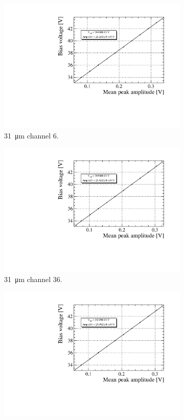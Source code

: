 \begin{figure}[htbp]
\begin{subfigure}{0.48\textwidth}
    \includegraphics[width=1\linewidth]{gfx/plots/WA/31/Breakdown_voltage6.pdf}
    \caption{\SI{31}{\micro m} channel $6$.}  
  \end{subfigure}
  \hfill  
  \begin{subfigure}{0.48\textwidth}
    \includegraphics[width=1\linewidth]{gfx/plots/WA/31/Breakdown_voltage36.pdf}
    \caption{\SI{31}{\micro m} channel $36$.}
  \end{subfigure}
  \hfill 
  \begin{subfigure}{0.48\textwidth}
    \includegraphics[width=1\linewidth]{gfx/plots/WA/31/Breakdown_voltage86.pdf}

\end{subfigure}
\end{figure}
